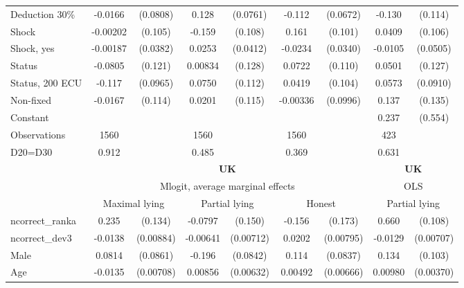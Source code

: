 \begin{tabular}{l|cccccc|cc}
Deduction 30\%&  -0.0166         & (0.0808)&    0.128\sym{*}  & (0.0761)&   -0.112\sym{*}  & (0.0672)&   -0.130         &  (0.114)\\
Shock         & -0.00202         &  (0.105)&   -0.159         &  (0.108)&    0.161         &  (0.101)&   0.0409         &  (0.106)\\
Shock, yes    & -0.00187         & (0.0382)&   0.0253         & (0.0412)&  -0.0234         & (0.0340)&  -0.0105         & (0.0505)\\
Status        &  -0.0805         &  (0.121)&  0.00834         &  (0.128)&   0.0722         &  (0.110)&   0.0501         &  (0.127)\\
Status, 200 ECU&   -0.117         & (0.0965)&   0.0750         &  (0.112)&   0.0419         &  (0.104)&   0.0573         & (0.0910)\\
Non-fixed     &  -0.0167         &  (0.114)&   0.0201         &  (0.115)& -0.00336         & (0.0996)&    0.137         &  (0.135)\\
Constant        &                  &         &                  &         &                  &         &    0.237         &  (0.554)\\
\hline
Observations    &     1560         &         &     1560         &         &     1560         &         &      423         &         \\
D20=D30         &    0.912         &         &    0.485         &         &    0.369         &         &    0.631         &         \\
\hline\hline
&\multicolumn{6}{c|}{\bf UK}&\multicolumn{2}{c}{\bf UK}\\ &\multicolumn{6}{c|}{Mlogit, average marginal effects }&\multicolumn{2}{c}{OLS}\\
                &\multicolumn{2}{c}{Maximal lying}&\multicolumn{2}{c}{Partial lying}&\multicolumn{2}{c}{Honest}  &\multicolumn{2}{c}{Partial lying}\\
\hline
ncorrect\_ranka  &    0.235\sym{*}  &  (0.134)&  -0.0797         &  (0.150)&   -0.156         &  (0.173)&    0.660\sym{***}&  (0.108)\\
ncorrect\_dev3   &  -0.0138         &(0.00884)& -0.00641         &(0.00712)&   0.0202\sym{**} &(0.00795)&  -0.0129\sym{*}  &(0.00707)\\
Male            &   0.0814         & (0.0861)&   -0.196\sym{**} & (0.0842)&    0.114         & (0.0837)&    0.134         &  (0.103)\\
Age             &  -0.0135\sym{*}  &(0.00708)&  0.00856         &(0.00632)&  0.00492         &(0.00666)&  0.00980\sym{**} &(0.00370)\\

\end{tabular}
